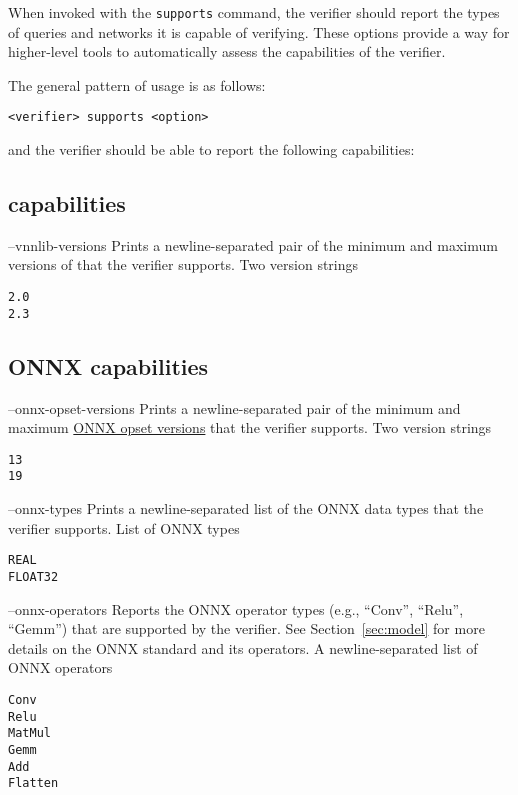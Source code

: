 When invoked with the \texttt{supports} command, the verifier should report the types of queries and networks it is capable of verifying.
These options provide a way for higher-level tools to automatically assess the capabilities of the verifier.

The general pattern of usage is as follows:
\begin{lstlisting}[style=bash]
<verifier> supports <option>
\end{lstlisting}
and the verifier should be able to report the following capabilities:

\subsection{\vnnlib{} capabilities}

\clOutputOption
{--vnnlib-versions}
{Prints a newline-separated pair of the minimum and maximum versions of \vnnlib{} that the verifier supports.}
{Two version strings}
\begin{lstlisting}[style=bash]
%*\exampleVerifier* supports --vnnlib-versions
2.0
2.3
\end{lstlisting}

\subsection{ONNX capabilities}

\clOutputOption
{--onnx-opset-versions}
{Prints a newline-separated pair of the minimum and maximum \href{https://onnxruntime.ai/docs/reference/compatibility.html\#onnx-opset-support}{ONNX opset versions} that the verifier supports.}
{Two version strings}
\begin{lstlisting}[style=bash]
%*\exampleVerifier* supports --onnx-opset-versions
13
19
\end{lstlisting}

\clOutputOption
{--onnx-types}
{Prints a newline-separated list of the ONNX data types that the verifier supports.}
{List of ONNX types}
\begin{lstlisting}[style=bash]
%*\exampleVerifier* supports --onnx-types
REAL
FLOAT32
\end{lstlisting}

\clOutputOption
{--onnx-operators}
{Reports the ONNX operator types (e.g., ``Conv'', ``Relu'', ``Gemm'') that are supported by the verifier. See Section~\ref{sec:model} for more details on the ONNX standard and its operators.
}
{A newline-separated list of ONNX operators}
\begin{lstlisting}[style=bash]
%*\exampleVerifier* supports --onnx-operators
Conv
Relu
MatMul
Gemm
Add
Flatten
\end{lstlisting}


